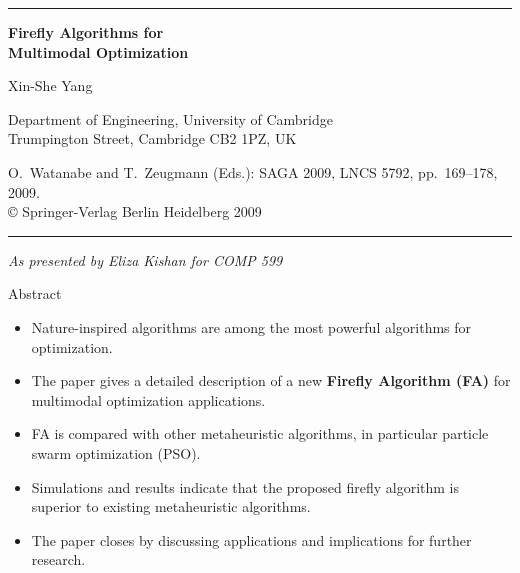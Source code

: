 \documentclass[aspectratio=169,11pt]{beamer}
\newcommand{\hdr}[1]{\gdef\curhdr{#1}}
\gdef\curhdr{}
\begin{document}
\begin{frame}[plain]
  \vspace*{0.6cm}
  {\color{gold}\rule{3cm}{2pt}}\par\vspace{0.4cm}
  {\color{navy}\fontsize{30}{34}\selectfont\bfseries Firefly Algorithms for\\Multimodal Optimization\par}
  \vspace{0.8cm}
  {\Large Xin-She Yang\par}
  \vspace{0.2cm}
  {\normalsize Department of Engineering, University of Cambridge\\
  Trumpington Street, Cambridge CB2 1PZ, UK\par}
  \vspace{0.5cm}
  {\small O.\ Watanabe and T.\ Zeugmann (Eds.): SAGA 2009, LNCS 5792, pp.\ 169--178, 2009.\\
  \copyright{} Springer-Verlag Berlin Heidelberg 2009\par}
  \vfill
  {\color{gold}\rule{\textwidth}{0.8pt}}\par\vspace{0.2cm}
  {\Large\itshape As presented by Eliza Kishan for COMP 599\par}
\end{frame}

\hdr{Abstract}
\begin{frame}[t]{Abstract}
\begin{itemize}\itemsep0.6em
  \item Nature-inspired algorithms are among the most powerful algorithms for optimization.
  \item The paper gives a detailed description of a new \textbf{Firefly Algorithm (FA)} for multimodal optimization applications.
  \item FA is compared with other metaheuristic algorithms, in particular particle swarm optimization (PSO).
  \item Simulations and results indicate that the proposed firefly algorithm is superior to existing metaheuristic algorithms.
  \item The paper closes by discussing applications and implications for further research.
\end{itemize}
\end{frame}
\end{document}
